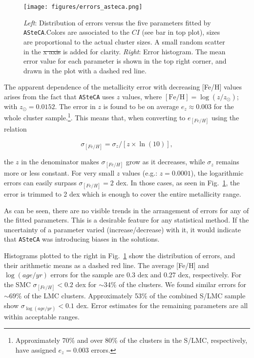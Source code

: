 \documentclass[draft]{aa}
\providecommand{\DIFaddtex}[1]{{\protect\color{blue}\uwave{#1}}} %
\providecommand{\DIFdeltex}[1]{{\protect\color{red}\sout{#1}}}                      %
\providecommand{\DIFaddFL}[1]{\DIFadd{#1}} %
\providecommand{\DIFdelFL}[1]{\DIFdel{#1}} %
\providecommand{\DIFaddbeginFL}{} %
\providecommand{\DIFaddendFL}{} %
\providecommand{\DIFdelbeginFL}{} %
\providecommand{\DIFdelendFL}{} %
\providecommand{\DIFadd}[1]{\texorpdfstring{\DIFaddtex{#1}}{#1}} %
\providecommand{\DIFdel}[1]{\texorpdfstring{\DIFdeltex{#1}}{}} %
\begin{document}
\begin{figure}[!ht]
\centering
\texttt{[image: figures/errors\_asteca.png]}
\caption{\emph{Left}: Distribution of errors versus the five parameters fitted
by \texttt{ASteCA}.\@ Colors are associated to the $CI$ (see bar in top plot),
sizes are proportional to the actual cluster sizes. A small random scatter in
the \DIFdelbeginFL \DIFdelFL{x axis }\DIFdelendFL \DIFaddbeginFL \DIFaddFL{x-axis }\DIFaddendFL is added for clarity.
\emph{Right}: Error histogram. The mean error value for each parameter is shown
in the top right corner, and drawn in the plot with a dashed red line.}
\label{fig:errors}
\end{figure}

The apparent dependence of the metallicity error with decreasing [Fe/H] values
arises from the fact that \texttt{ASteCA} uses $z$ values, where
$\mathrm{[Fe/H]}{=}\log(z/z_{\odot})$; with $z_{\odot}{=}0.0152$.
The error in $z$ is found to be on average $e_z{\approx}0.003$ for the whole
cluster sample.\footnote{Approximately 70\% and over 80\% of the clusters in the
S/LMC, respectively, have assigned $e_z{=}0.003$ errors.}. This means that, when
converting to $e_{[Fe/H]}$ using the relation

\begin{equation}
\sigma_{[Fe/H]} = \sigma_z/[z\times\ln(10)],
\end{equation}

\noindent the $z$ in the denominator makes $\sigma_{[Fe/H]}$ grow as it
decreases, while $\sigma_z$ remains more or less constant.
For very small $z$ values (e.g.: $z{=}0.0001$), the
logarithmic errors can easily surpass $\sigma_{[Fe/H]}{=}2$ dex. In those cases,
as seen in Fig.~\ref{fig:errors}, the error is trimmed to 2 dex which is
enough to cover the entire metallicity range.

As can be seen, there are no visible trends in the arrangement of errors for any
of the fitted parameters. This is a desirable feature for any statistical
method. If the uncertainty of a parameter varied (increase/decrease) with it, it
would indicate that \texttt{ASteCA} was introducing biases in the solutions.

Histograms plotted to the right in Fig.~\ref{fig:errors} show the distribution
of errors, and their arithmetic means as a dashed red line.
The average [Fe/H] and $\log(age/yr)$ errors for the sample are 0.3 dex and
0.27 dex, respectively. For the SMC $\sigma_{[Fe/H]}{<}0.2$ dex for $\sim$34\%
of the clusters. We found similar errors for ${\sim}69\%$ of the LMC clusters.
Approximately 53\% of the combined S/LMC sample show
$\sigma_{\log(age/yr)}{<}0.1$ dex. Error estimates for the remaining parameters
are all within acceptable ranges.\\
\end{document}
